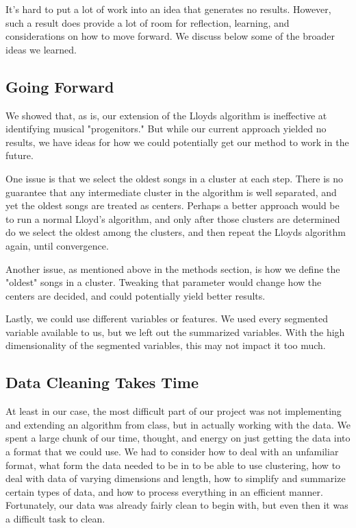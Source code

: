 It's hard to put a lot of work into an idea that generates no results.
However, such a result does provide a lot of room for reflection, learning, and considerations on how to move forward.
We discuss below some of the broader ideas we learned.

\subsection{Going Forward}

We showed that, as is, our extension of the Lloyds algorithm is ineffective at identifying musical "progenitors."
But while our current approach yielded no results,
we have ideas for how we could potentially get our method to work in the future.

One issue is that we select the oldest songs in a cluster at each step.
There is no guarantee that any intermediate cluster in the algorithm is well separated,
and yet the oldest songs are treated as centers.
Perhaps a better approach would be to run a normal Lloyd's algorithm,
and only after those clusters are determined do we select the oldest among the clusters,
and then repeat the Lloyds algorithm again, until convergence.

Another issue, as mentioned above in the methods section,
is how we define the "oldest" songs in a cluster.
Tweaking that parameter would change how the centers are decided,
and could potentially yield better results.

Lastly, we could use different variables or features.
We used every segmented variable available to us, but we left out the summarized variables.
With the high dimensionality of the segmented variables, this may not impact it too much.


\subsection{Data Cleaning Takes Time}

At least in our case, the most difficult part of our project was not implementing and extending an algorithm
from class, but in actually working with the data.
We spent a large chunk of our time, thought,
and energy on just getting the data into a format that we could use.
We had to consider how to deal with an unfamiliar format,
what form the data needed to be in to be able to use clustering,
how to deal with data of varying dimensions and length,
how to simplify and summarize certain types of data,
and how to process everything in an efficient manner.
Fortunately, our data was already fairly clean to begin with,
but even then it was a difficult task to clean.

